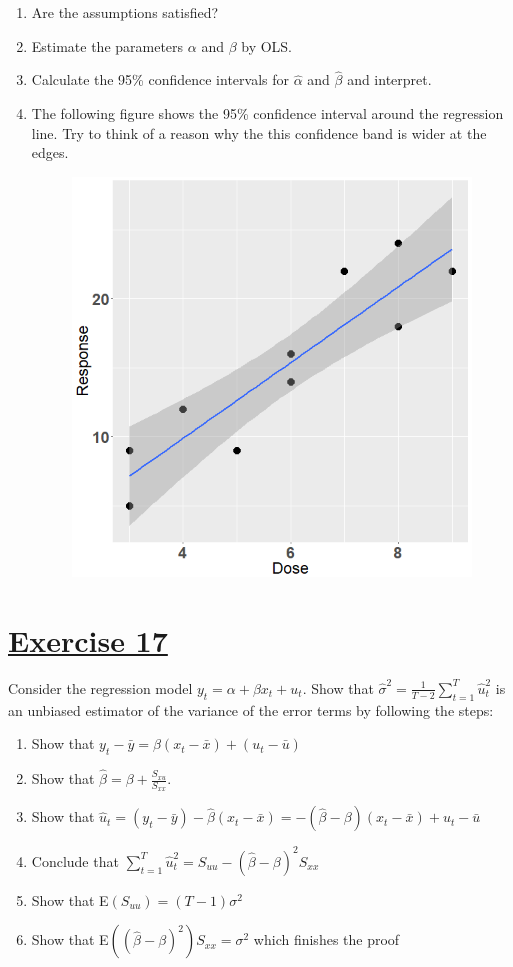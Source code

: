 \documentclass[captions=tableheading, 12pt, headings=small, parskip=half]{scrartcl}
\begin{document}
\begin{enumerate}[label = \alph*)]
	\item Are the assumptions satisfied?
	\item Estimate the parameters $\alpha$ and $\beta$ by OLS.
	\item Calculate the 95\% confidence intervals for $\hat{\alpha}$ and $\hat{\beta}$ and interpret.
	\item The following figure shows the 95\% confidence interval around the regression line. Try to think of a reason why the this confidence band is wider at the edges.
	\begin{figure}[H]
		\centering
		\includegraphics[width = 0.5\columnwidth]{Code1/DoseRespFit.png}
	\end{figure}
\end{enumerate}


\section*{\underline{Exercise 17}}
Consider the regression model $y_t = \alpha + \beta x_t + u_t$. Show that $\hat{\sigma}^2 = \frac{1}{T-2}\sum_{t=1}^T \hat{u}_t^2$ is an unbiased estimator of the variance of the error terms by following the steps:
\begin{enumerate}[label = Step \arabic*)]
	\item Show that $y_t - \bar{y} = \beta(x_t - \bar{x}) + (u_t - \bar{u})$
	\item Show that $\hat{\beta} = \beta + \frac{S_{xu}}{S_{xx}}$.
	\item Show that $\hat{u}_t = (y_t - \bar{y}) - \hat{\beta}(x_t - \bar{x}) = -(\hat{\beta} - \beta)(x_t - \bar{x}) + u_t - \bar{u}$
	\item Conclude that $\sum_{t = 1}^T{\hat{u}_t^2} = S_{uu} -(\hat{\beta}-\beta)^2S_{xx}$
	\item Show that E$(S_{uu}) = (T-1)\sigma^2$
	\item Show that E$\left((\hat{\beta} - \beta)^2\right)S_{xx} = \sigma^2$ which finishes the proof
\end{enumerate}
\newpage
\end{document}
